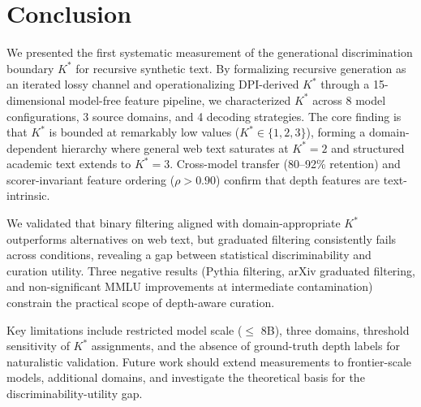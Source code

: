 \documentclass[11pt,a4paper]{article}
\begin{document}
\section{Conclusion}

We presented the first systematic measurement of the generational discrimination boundary $K^*$ for recursive synthetic text. By formalizing recursive generation as an iterated lossy channel and operationalizing DPI-derived $K^*$ through a 15-dimensional model-free feature pipeline, we characterized $K^*$ across 8 model configurations, 3 source domains, and 4 decoding strategies. The core finding is that $K^*$ is bounded at remarkably low values ($K^* \in \{1, 2, 3\}$), forming a domain-dependent hierarchy where general web text saturates at $K^* = 2$ and structured academic text extends to $K^* = 3$. Cross-model transfer (80--92\% retention) and scorer-invariant feature ordering ($\rho > 0.90$) confirm that depth features are text-intrinsic.

We validated that binary filtering aligned with domain-appropriate $K^*$ outperforms alternatives on web text, but graduated filtering consistently fails across conditions, revealing a gap between statistical discriminability and curation utility. Three negative results (Pythia filtering, arXiv graduated filtering, and non-significant MMLU improvements at intermediate contamination) constrain the practical scope of depth-aware curation.

Key limitations include restricted model scale ($\leq$ 8B), three domains, threshold sensitivity of $K^*$ assignments, and the absence of ground-truth depth labels for naturalistic validation. Future work should extend measurements to frontier-scale models, additional domains, and investigate the theoretical basis for the discriminability-utility gap.
\end{document}
